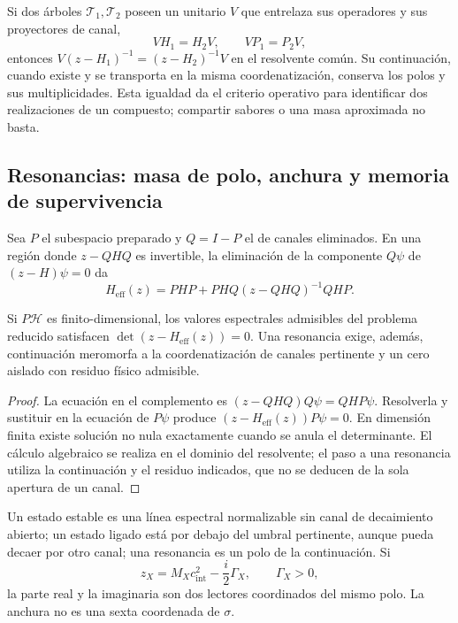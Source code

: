 Si dos árboles \(\mathcal T_1,\mathcal T_2\) poseen un unitario
\(V\) que entrelaza sus operadores y sus proyectores de canal,
\[
 VH_1=H_2V,\qquad VP_1=P_2V,
\]
entonces \(V(z-H_1)^{-1}=(z-H_2)^{-1}V\) en el resolvente común.
Su continuación, cuando existe y se transporta en la misma coordenatización,
conserva los polos y sus multiplicidades. Esta igualdad da el criterio
operativo para identificar dos realizaciones de un compuesto; compartir
sabores o una masa aproximada no basta.

\subsection{Resonancias: masa de polo, anchura y memoria de supervivencia}
\label{vi:subsec:resonancias-familias}

Sea \(P\) el subespacio preparado y \(Q=I-P\) el de canales
eliminados. En una región donde \(z-QHQ\) es invertible, la eliminación
de la componente \(Q\psi\) de \((z-H)\psi=0\) da
\begin{equation}
 H_{\mathrm{eff}}(z)=PHP+PHQ(z-QHQ)^{-1}QHP.
 \label{vi:eq:feshbach-familias}
\end{equation}

\begin{proposition}
\label{vi:prop:feshbach-familias}
Si \(P\mathcal H\) es finito-dimensional, los valores espectrales
admisibles del problema reducido satisfacen
\(\det(z-H_{\mathrm{eff}}(z))=0\). Una resonancia exige, además,
continuación meromorfa a la coordenatización de canales pertinente y un cero
aislado con residuo físico admisible.
\end{proposition}
\begin{proof}
La ecuación en el complemento es
\((z-QHQ)Q\psi=QHP\psi\). Resolverla y sustituir en la ecuación
de \(P\psi\) produce \((z-H_{\mathrm{eff}}(z))P\psi=0\).
En dimensión finita existe solución no nula exactamente cuando se
anula el determinante. El cálculo algebraico se realiza en el dominio
del resolvente; el paso a una resonancia utiliza la continuación y el
residuo indicados, que no se deducen de la sola apertura de un canal.
\end{proof}

Un estado estable es una línea espectral normalizable sin canal de
decaimiento abierto; un estado ligado está por debajo del umbral
pertinente, aunque pueda decaer por otro canal; una resonancia es un
polo de la continuación. Si
\[
 z_X=M_Xc_{\mathrm{int}}^2-\frac{i}{2}\Gamma_X,
 \qquad\Gamma_X>0,
\]
la parte real y la imaginaria son dos lectores coordinados del mismo
polo. La anchura no es una sexta coordenada de \(\sigma\).


